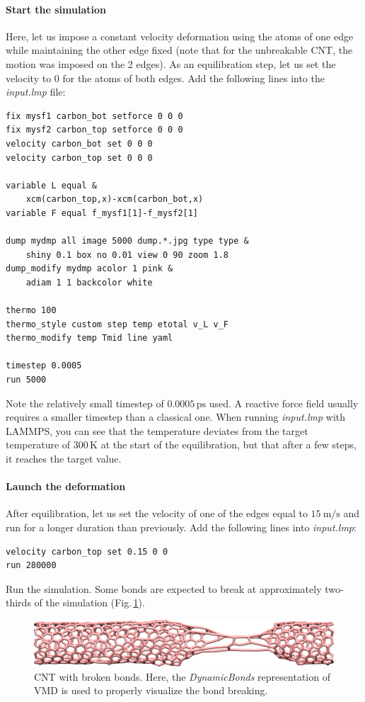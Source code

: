 \documentclass[9pt,tutorial]{livecoms}
\begin{document}
\paragraph{Start the simulation}
Here, let us impose a constant velocity deformation using the atoms of one
edge while maintaining the other edge fixed (note that for the unbreakable CNT,
the motion was imposed on the 2 edges). As an equilibration step, let us set the
velocity to 0 for the atoms of both edges. Add the following lines into
the \textit{input.lmp} file:
{\normalsize \begin{verbatim}
fix mysf1 carbon_bot setforce 0 0 0
fix mysf2 carbon_top setforce 0 0 0
velocity carbon_bot set 0 0 0
velocity carbon_top set 0 0 0

variable L equal &
    xcm(carbon_top,x)-xcm(carbon_bot,x)
variable F equal f_mysf1[1]-f_mysf2[1]

dump mydmp all image 5000 dump.*.jpg type type &
    shiny 0.1 box no 0.01 view 0 90 zoom 1.8
dump_modify mydmp acolor 1 pink &
    adiam 1 1 backcolor white

thermo 100
thermo_style custom step temp etotal v_L v_F
thermo_modify temp Tmid line yaml

timestep 0.0005
run 5000
\end{verbatim}}
Note the relatively small timestep of $0.0005\,\text{ps}$ used. A reactive force
field usually requires a smaller timestep than a classical one. When running
\textit{input.lmp} with LAMMPS, you can see that the temperature deviates
from the target temperature of $300\,\text{K}$ at the start of the equilibration,
but that after a few steps, it reaches the target value.

\paragraph{Launch the deformation}
After equilibration, let us set the velocity of one of the edges equal to
$15~\text{m/s}$ and run for a longer duration than previously. Add the following
lines into \textit{input.lmp}:
{\normalsize \begin{verbatim}
velocity carbon_top set 0.15 0 0
run 280000
\end{verbatim}}
Run the simulation. Some bonds are expected to break at approximately
two-thirds of the simulation (Fig.\,\ref{fig:CNT-deformed-breakable}).

\begin{figure}
\centering
\includegraphics[width=\linewidth]{CNT-deformed-breakable}
\caption{CNT with broken bonds. Here, the \textit{DynamicBonds} representation
of VMD is used to properly visualize the bond breaking.}
\label{fig:CNT-deformed-breakable}
\end{figure}
\end{document}
